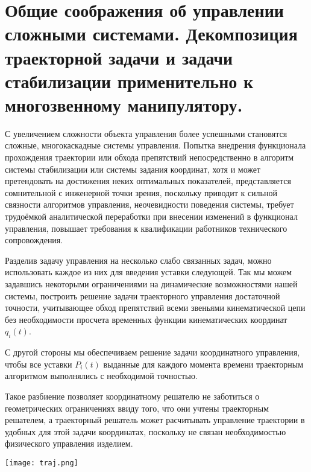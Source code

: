 \section{Общие соображения об управлении сложными системами. Декомпозиция траекторной задачи и задачи стабилизации применительно к многозвенному манипулятору.}

С увеличением сложности объекта управления более успешными становятся сложные, многокаскадные системы управления. Попытка внедрения функционала прохождения траектории или обхода препятствий непосредственно в алгоритм системы стабилизации или системы задания координат, хотя и может претендовать на достижения неких оптимальных показателей, представляется сомнительной с инженерной точки зрения, поскольку приводит к сильной связности алгоритмов управления, неочевидности поведения системы, требует трудоёмкой аналитической переработки при внесении изменений в функционал управления, повышает требования к квалификации работников технического сопровождения.

Разделив задачу управления на несколько слабо связанных задач, можно использовать каждое из них для введения уставки следующей. Так мы можем задавшись некоторыми ограничениями на динамические возможностями нашей системы, построить решение задачи траекторного управления достаточной точности, учитывающее обход препятствий всеми звеньями кинематической цепи без необходимости просчета временных функции кинематических координат $q_i(t)$. 

С другой стороны мы обеспечиваем решение задачи координатного управления, чтобы все уставки $P_i(t)$ выданные для каждого момента времени траекторным алгоритмом выполнялись с необходимой точностью.

Такое разбиение позволяет координатному решателю не заботиться о геометрических ограничениях ввиду того, что они учтены траекторным решателем, а траекторный решатель может расчитывать управление траектории в удобных для этой задачи координатах, поскольку не связан необходимостью физического управления изделием.   

\begin{center}
  \texttt{[image: traj.png]}
  \label{}
\end{center}